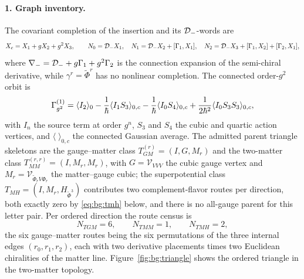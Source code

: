 \paragraph{1. Graph inventory.} The covariant completion of the insertion and its $\mathcal{D}_{-}$-words are
\begin{equation}\label{eq:bg:source}
X_{c}=X_{1}+gX_{2}+g^{2}X_{3}, \qquad N_{0}=\mathcal{D}_{-}X_{1}, \quad N_{1}=\mathcal{D}_{-}X_{2}+[\Gamma_{1},X_{1}], \quad N_{2}=\mathcal{D}_{-}X_{3}+[\Gamma_{1},X_{2}]+[\Gamma_{2},X_{1}],
\end{equation}
where $\nabla_{-}=\mathcal{D}_{-}+g\Gamma_{1}+g^{2}\Gamma_{2}$ is the connection expansion of the semi-chiral derivative,
while $\gamma^{r}=\widetilde\Phi^{r}$ has no nonlinear completion. The connected order-$g^{2}$ orbit is
\begin{equation}\label{eq:bg:orbit}
\Gamma^{(1)}_{g^{2}} =\langle I_{2}\rangle_{0} -\frac1{\hbar}\langle I_{1}S_{3}\rangle_{0,c} -\frac1{\hbar}\langle I_{0}S_{4}\rangle_{0,c} +\frac1{2\hbar^{2}}\langle I_{0}S_{3}S_{3}\rangle_{0,c} ,
\end{equation}
with $I_{n}$ the source term at order $g^{n}$, $S_{3}$ and $S_{4}$ the cubic and quartic action vertices, and
$\langle\;\rangle_{0,c}$ the connected Gaussian average. The admitted parent triangle skeletons are the
gauge--matter class $T_{GM}^{(r)}=(I,G,M_{r})$ and the two-matter class $T_{MM}^{(r,r)}=(I,M_{r},M_{r})$, with
$G=\mathcal V_{VVV}$ the cubic gauge vertex and $M_{r}=\mathcal V_{\widetilde\Phi_{r}V\Phi_{r}}$ the matter--gauge
cubic; the superpotential class $T_{MH}=(I,M_{r},H_{\widetilde\Phi^{3}})$ contributes two complement-flavor routes
per direction, both exactly zero by
\eqref{eq:bg:tmh} below, and there is no all-gauge parent for this letter pair. Per ordered direction the route census is
\begin{equation}\label{eq:bg:census}
N_{TGM}=6, \qquad N_{TMM}=1, \qquad N_{TMH}=2 ,
\end{equation}
the six gauge--matter routes being the six permutations of the three internal edges $(r_{0},r_{1},r_{2})$, each
with two derivative placements times two Euclidean chiralities of the matter line. Figure~\ref{fig:bg:triangle}
shows the ordered triangle in the two-matter topology.

